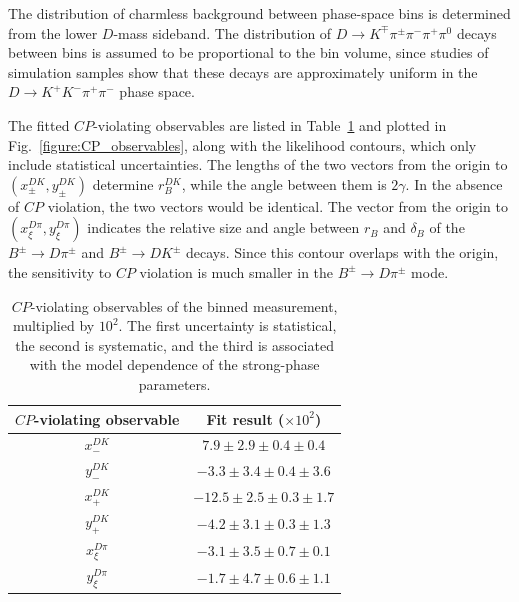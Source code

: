 \documentclass[12pt, a4paper, notitlepage, onecolumn]{article}
\begin{document}
The distribution of charmless background between phase-space bins is determined from the lower $D$-mass sideband. The distribution of $D\to K^\mp\pi^\pm\pi^-\pi^+\pi^0$ decays between bins is assumed to be proportional to the bin volume, since studies of simulation samples show that these decays are approximately uniform in the $D\to K^+K^-\pi^+\pi^-$ phase space.

The fitted $C\!P$-violating observables are listed in Table~\ref{table:GGSZ_observables} and plotted in Fig.~\ref{figure:CP_observables}, along with the likelihood contours, which only include statistical uncertainties. The lengths of the two vectors from the origin to $(x_\pm^{DK}, y_\pm^{DK})$ determine $r_B^{DK}$, while the angle between them is $2\gamma$. In the absence of $C\!P$ violation, the two vectors would be identical. The vector from the origin to $(x_\xi^{D\pi}, y_\xi^{D\pi})$ indicates the relative size and angle between $r_B$ and $\delta_B$ of the $B^\pm\to D\pi^\pm$ and $B^\pm\to DK^\pm$ decays. Since this contour overlaps with the origin, the sensitivity to $C\!P$ violation is much smaller in the $B^\pm\to D\pi^\pm$ mode.

\begin{table}[htb]
    \centering
    \caption{$C\!P$-violating observables of the binned measurement, multiplied by $10^2$.  The first uncertainty is statistical, the second is systematic, and the third is associated with the model dependence of the strong-phase parameters.}
    \label{table:GGSZ_observables}
    \begin{tabular}{cc} 
        \toprule
        $C\!P$-violating observable & Fit result ($\times 10^2$)           \\
        \midrule
        $x_-^{DK}$      & \phantom{+}$7.9 \pm 2.9 \pm 0.4 \pm 0.4$        \\
        $y_-^{DK}$      & $-3.3 \pm 3.4 \pm 0.4 \pm 3.6$       \\
        $x_+^{DK}$      & $-12.5 \pm 2.5 \pm 0.3 \pm 1.7$\phantom{0}      \\
        $y_+^{DK}$      & $-4.2 \pm 3.1 \pm 0.3 \pm 1.3$ \\
        $x_\xi^{D\pi}$    & $-3.1 \pm 3.5 \pm 0.7 \pm 0.1$       \\
        $y_\xi^{D\pi}$    & $-1.7 \pm 4.7 \pm 0.6 \pm 1.1$       \\
        \bottomrule
    \end{tabular}
\end{table}
\end{document}
